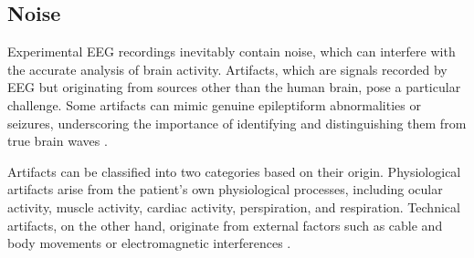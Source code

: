 \documentclass[a4paper, UKenglish, 11pt]{uiomaster}
\begin{document}
\subsection{Noise}
%
%


Experimental EEG recordings inevitably contain noise, which can interfere with the accurate analysis of brain activity. Artifacts, which are signals recorded by EEG but originating from sources other than the human brain, pose a particular challenge. Some artifacts can mimic genuine epileptiform abnormalities or seizures, underscoring the importance of identifying and distinguishing them from true brain waves \cite{sazgar2019eeg}.

Artifacts can be classified into two categories based on their origin. Physiological artifacts arise from the patient's own physiological processes, including ocular activity, muscle activity, cardiac activity, perspiration, and respiration. Technical artifacts, on the other hand, originate from external factors such as cable and body movements or electromagnetic interferences \cite{bitbrain}.
\end{document}
